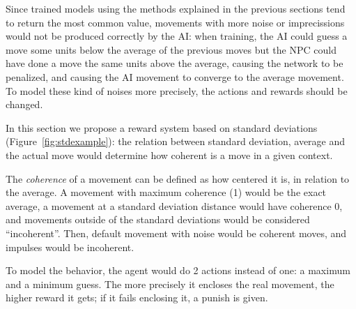 Since trained models using the methods explained in the previous sections tend to return the most common value, movements with more noise or imprecissions would not be produced correctly by the AI: when training, the AI could guess a move some units below the average of the previous moves but the NPC could have done a move the same units above the average, causing the network to be penalized, and causing the AI movement to converge to the average movement. To model these kind of noises more precisely, the actions and rewards should be changed.

\pagebreak

In this section we propose a reward system based on standard deviations (Figure~\ref{fig:stdexample}): the relation between standard deviation, average and the actual move would determine how coherent is a move in a given context.

The \emph{coherence} of a movement can be defined as how centered it is, in relation to the average. A movement with maximum coherence (1) would be the exact average, a movement at a standard deviation distance would have coherence 0, and movements outside of the standard deviations would be considered ``incoherent''. Then, default movement with noise would be coherent moves, and impulses would be incoherent.

To model the behavior, the agent would do 2 actions instead of one: a maximum and a minimum guess. The more precisely it encloses the real movement, the higher reward it gets; if it fails enclosing it, a punish is given.

